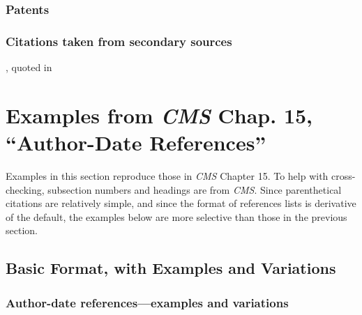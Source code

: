 \documentclass[11pt,letterpaper,oneside]{article}
\begin{document}
\begin{citebib}
\item \cite{aristotle1983}
\item \cite{maimonides1965}
\end{citebib}

\setcounter{subsubsection}{257}
\subsubsection{Patents}

\begin{citebib}
\item \cite{iizuka1986}
\end{citebib}

\setcounter{subsubsection}{259}
\subsubsection{Citations taken from secondary sources}

\begin{citebib}
\item \cite[269]{zukofsky1931}, quoted in \cite[78]{costello1981}
\end{citebib}

\section{Examples from \emph{CMS} Chap. 15, ``Author-Date
References''}
\label{paren}

Examples in this section reproduce those in \textit{CMS} Chapter 15.
To help with cross-checking, subsection numbers and headings are from
\textit{CMS}. Since parenthetical citations are relatively simple, and
since the format of references lists is derivative of the default,
the examples below are more selective than those in the previous
section.

\subsection{Basic Format, with Examples and Variations}
\setcounter{subsection}{15}

\setcounter{subsubsection}{8}
\subsubsection{Author-date references—examples and variations}
\end{document}

